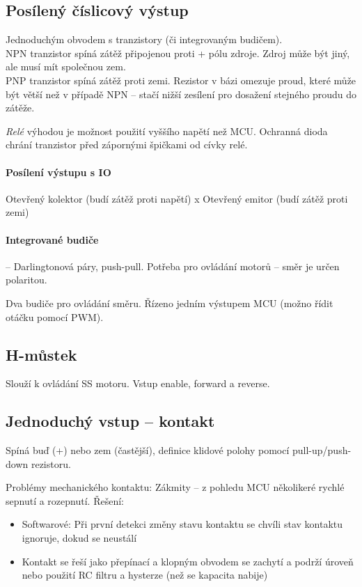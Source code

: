 \documentclass[a4paper, 11pt]{report}
\begin{document}
\subsection{Posílený číslicový výstup}
Jednoduchým obvodem s tranzistory (či integrovaným budičem).\\
NPN tranzistor spíná zátěž připojenou proti + pólu zdroje. Zdroj může být jiný, ale musí mít společnou zem.\\
PNP tranzistor spíná zátěž proti zemi. Rezistor v bázi omezuje proud, které může být větší než v případě NPN -- stačí nižší zesílení pro dosažení stejného proudu do zátěže.

\emph{Relé} výhodou je možnost použití vyššího napětí než MCU. Ochranná dioda chrání tranzistor před zápornými špičkami od cívky relé.

\paragraph{Posílení výstupu s IO} Otevřený kolektor (budí zátěž proti napětí) x Otevřený emitor (budí zátěž proti zemi)

\paragraph{Integrované budiče} -- Darlingtonová páry, push-pull. Potřeba pro ovládání motorů -- směr je určen polaritou.

Dva budiče pro ovládání směru. Řízeno jedním výstupem MCU (možno řídit otáčku pomocí PWM).

\subsection{H-můstek}
Slouží k ovládání SS motoru. Vstup enable, forward a reverse.

\subsection{Jednoduchý vstup -- kontakt}
Spíná buď (+) nebo zem (častější), definice klidové polohy pomocí pull-up/push-down rezistoru.

Problémy mechanického kontaktu: Zákmity -- z pohledu MCU několikeré rychlé sepnutí a rozepnutí. Řešení:
\begin{itemize}
	\item Softwarové: Při první detekci změny stavu kontaktu se chvíli stav kontaktu ignoruje, dokud se neustálí
	\item Kontakt se řeší jako přepínací a klopným obvodem se zachytí a podrží úroveň nebo použití RC filtru a hysterze (než se kapacita nabije)
\end{itemize}
\end{document}
